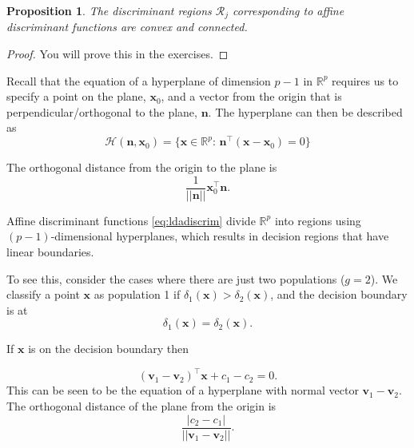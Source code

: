 \documentclass[
]{book}
\newtheorem{proposition}{Proposition}[chapter]
\theoremstyle{definition}
\theoremstyle{definition}
\theoremstyle{definition}
\theoremstyle{definition}
\theoremstyle{remark}
\begin{document}
\begin{proposition}
\protect\hypertarget{prp:ldaconvex}{}\label{prp:ldaconvex}The discriminant regions \(\mathcal{R}_j\) corresponding to affine discriminant functions are convex and connected.
\end{proposition}

\begin{proof}
You will prove this in the exercises.
\end{proof}

Recall that the equation of a hyperplane of dimension \(p-1\) in \(\mathbb{R}^p\) requires us to specify a point on the plane, \(\mathbf x_0\), and a vector from the origin that is perpendicular/orthogonal to the plane, \(\mathbf n\). The hyperplane can then be described as
\[
\mathcal{H}(\mathbf n, \mathbf x_0) =\{\mathbf x\in \mathbb{R}^p:\, \mathbf n^\top (\mathbf x-\mathbf x_0)  =0\}
\]

The orthogonal distance from the origin to the plane is
\[\frac{1}{||\mathbf n||}\mathbf x_0^\top \mathbf n.\]

Affine discriminant functions \eqref{eq:ldadiscrim} divide \(\mathbb{R}^p\) into regions using \((p-1)\)-dimensional hyperplanes, which results in decision regions that have linear boundaries.

To see this, consider the cases where there are just two populations (\(g=2\)). We classify a point \(\mathbf x\) as population 1 if \(\delta_1(\mathbf x) > \delta_2(\mathbf x)\), and the decision boundary is at
\[\delta_1(\mathbf x) = \delta_2(\mathbf x).\]

If \(\mathbf x\) is on the decision boundary then

\[(\mathbf v_1-\mathbf v_2)^\top \mathbf x+ c_1 -c_2=0.\]
This can be seen to be the equation of a hyperplane with normal vector \(\mathbf v_1-\mathbf v_2\). The orthogonal distance of the plane from the origin is
\[\frac{|c_2-c_1|}{||\mathbf v_1-\mathbf v_2||}.\]
\end{document}
